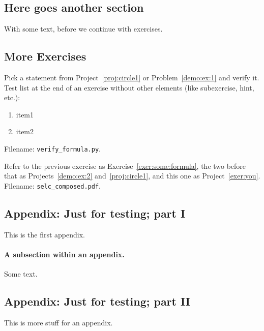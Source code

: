 \documentclass[%
oneside,                 %
final,                   %
10pt]{article}
\newenvironment{doconceexercise}{}{}
\newcounter{doconceexercisecounter}
\theoremstyle{definition}
\begin{document}
\begin{enumerate}
\subsection{Here goes another section}
With some text, before we continue with exercises.
\subsection{More Exercises}
\begin{doconceexercise}
                             
\label{exer:some:formula}
Pick a statement from Project~\vref{proj:circle1} or Problem~\vref{demo:ex:1}
and verify it.
Test list at the end of an exercise without other elements (like subexercise,
hint, etc.):
\begin{enumerate}
\item item1
\item item2
\end{enumerate}
\noindent
\noindent Filename: \Verb!verify_formula.py!.
\end{doconceexercise}
\begin{doconceexercise}
                             
\label{exer:you}
Refer to the previous exercise as Exercise~\vref{exer:some:formula},
the two before that as Projects~\vref{demo:ex:2} and~\vref{proj:circle1},
and this one as Project~\vref{exer:you}.
\noindent Filename: \Verb!selc_composed.pdf!.
\end{doconceexercise}


\subsection{Appendix: Just for testing; part I}
\label{app1}
This is the first appendix.
\paragraph{A subsection within an appendix.}
Some text.
\subsection{Appendix: Just for testing; part II}
\label{app2}
This is more stuff for an appendix.

\end{enumerate}
\end{document}
